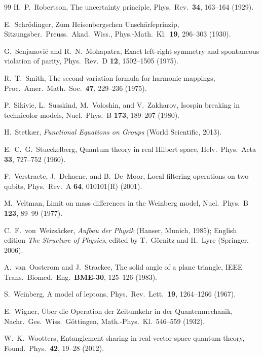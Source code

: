 \documentclass[aps,pra,onecolumn,superscriptaddress,nofootinbib,10pt]{revtex4-2}
\theoremstyle{definition}
\theoremstyle{remark}
\begin{document}
\begin{thebibliography}{99}
 H.~P.~Robertson, The uncertainty principle, Phys.\ Rev.\ \textbf{34}, 163--164 (1929).

 E.~Schr\"odinger, Zum Heisenbergschen Unsch\"arfeprinzip, Sitzungsber.\ Preuss.\ Akad.\ Wiss., Phys.-Math.\ Kl.\ \textbf{19}, 296--303 (1930).

 G.~Senjanovi\'c and R.~N.~Mohapatra, Exact left-right symmetry and spontaneous violation of parity, Phys.\ Rev.\ D \textbf{12}, 1502--1505 (1975).

 R.~T.~Smith, The second variation formula for harmonic mappings, Proc.\ Amer.\ Math.\ Soc.\ \textbf{47}, 229--236 (1975).

 P.~Sikivie, L.~Susskind, M.~Voloshin, and V.~Zakharov, Isospin breaking in technicolor models, Nucl.\ Phys.\ B \textbf{173}, 189--207 (1980).

 H.~Stetk\ae r, \emph{Functional Equations on Groups} (World Scientific, 2013).

 E.~C.~G.~Stueckelberg, Quantum theory in real Hilbert space, Helv.\ Phys.\ Acta \textbf{33}, 727--752 (1960).

 F.~Verstraete, J.~Dehaene, and B.~De~Moor, Local filtering operations on two qubits, Phys.\ Rev.\ A \textbf{64}, 010101(R) (2001).

 M.~Veltman, Limit on mass differences in the Weinberg model, Nucl.\ Phys.\ B \textbf{123}, 89--99 (1977).

 C.~F.~von~Weizs\"acker, \emph{Aufbau der Physik} (Hanser, Munich, 1985); English edition \emph{The Structure of Physics}, edited by T.~G\"ornitz and H.~Lyre (Springer, 2006).

 A.~van~Oosterom and J.~Strackee, The solid angle of a plane triangle, IEEE Trans.\ Biomed.\ Eng.\ \textbf{BME-30}, 125--126 (1983).

 S.~Weinberg, A model of leptons, Phys.\ Rev.\ Lett.\ \textbf{19}, 1264--1266 (1967).

 E.~Wigner, \"Uber die Operation der Zeitumkehr in der Quantenmechanik, Nachr.\ Ges.\ Wiss.\ G\"ottingen, Math.-Phys.\ Kl.\ 546--559 (1932). %

 W.~K.~Wootters, Entanglement sharing in real-vector-space quantum theory, Found.\ Phys.\ \textbf{42}, 19--28 (2012).


\end{thebibliography}
\end{document}
